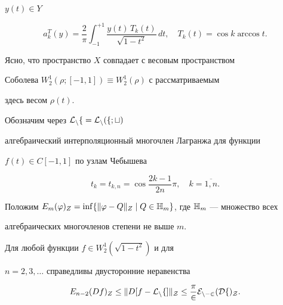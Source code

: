 $y(t)\in Y$


$$


a_k^T(y)=\frac{2}{\pi}\int_{-1}^{+1}\frac{y(t)\, T_k(t)}{\sqrt{1-t^2}}\, dt,


\quad T_k(t)=\cos k \arccos t.


$$





Ясно, что пространство $X$ совпадает с весовым пространством


Соболева $W_2^1(\rho ;[-1,1])\equiv W_2^1(\rho )$ с рассматриваемым


здесь весом $\rho(t)$.





Обозначим через $\cal L_nf = \cal L_n(f;t)$


алгебраический интерполяционный многочлен Лагранжа для функции


$f(t)\in C[-1,1]$ по узлам Чебышева


\begin{equation}


t_k=t_{k,n}=\cos \frac{2k-1}{2n}\pi ,\quad k=\overline{1,n}.


\end{equation}


%


Положим $E_m(\varphi )_Z=\inf \{ \|\varphi -Q\|_Z\mid


Q\in \Bbb{H}_m \}$, где $\Bbb{H}_m$ --- множество всех


алгебраических многочленов степени не выше $m$.





\begin{lem}


Для любой функции $f\in W_2^1(\sqrt{1-t^2})$ и для 


$n=2, 3, \dotsc $ справедливы двусторонние неравенства


\begin{equation}


E_{n-2}(Df)_Z\le \| D[f-\cal L_nf]\|_Z


\le \frac{\pi }{2}E_{n-2}(Df)_Z.


\end{equation}


\end{lem}





